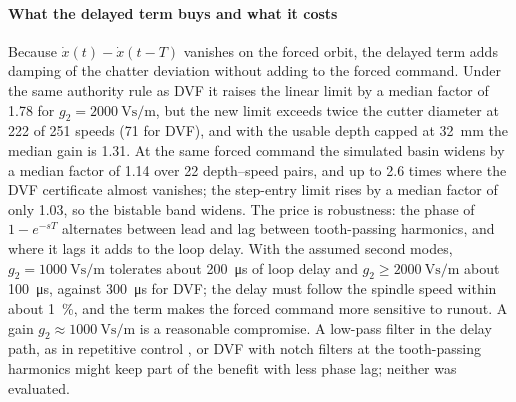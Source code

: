 \paragraph{What the delayed term buys and what it costs}
Because $\dot x(t)-\dot x(t-T)$ vanishes on the forced orbit, the delayed term adds damping of the chatter deviation without adding to the forced command. Under the same authority rule as DVF it raises the linear limit by a median factor of 1.78 for $g_2=\SI{2000}{\volt\second\per\metre}$, but the new limit exceeds twice the cutter diameter at 222 of 251 speeds (71 for DVF), and with the usable depth capped at \SI{32}{\milli\metre} the median gain is 1.31. At the same forced command the simulated basin widens by a median factor of 1.14 over 22 depth--speed pairs, and up to 2.6 times where the DVF certificate almost vanishes; the step-entry limit rises by a median factor of only 1.03, so the bistable band widens. The price is robustness: the phase of $1-e^{-sT}$ alternates between lead and lag between tooth-passing harmonics, and where it lags it adds to the loop delay. With the assumed second modes, $g_2=\SI{1000}{\volt\second\per\metre}$ tolerates about \SI{200}{\micro\second} of loop delay and $g_2\ge\SI{2000}{\volt\second\per\metre}$ about \SI{100}{\micro\second}, against \SI{300}{\micro\second} for DVF; the delay must follow the spindle speed within about \SI{1}{\percent}, and the term makes the forced command more sensitive to runout. A gain $g_2\approx\SI{1000}{\volt\second\per\metre}$ is a reasonable compromise. A low-pass filter in the delay path, as in repetitive control \citep{hara1988repetitive}, or DVF with notch filters at the tooth-passing harmonics \citep{herzog1996unbalance} might keep part of the benefit with less phase lag; neither was evaluated.

